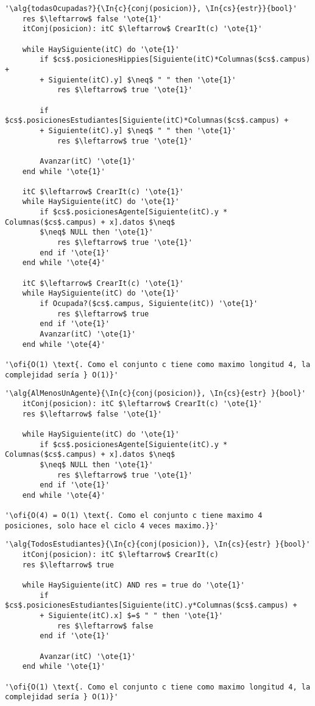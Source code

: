 \begin{lstlisting}[mathescape]
'\alg{todasOcupadas?}{\In{c}{conj(posicion)}, \In{cs}{estr}}{bool}'
	res $\leftarrow$ false '\ote{1}'
	itConj(posicion): itC $\leftarrow$ CrearIt(c) '\ote{1}'
	
	while HaySiguiente(itC) do '\ote{1}'
		if $cs$.posicionesHippies[Siguiente(itC)*Columnas($cs$.campus) +
		+ Siguiente(itC).y] $\neq$ " " then '\ote{1}'
			res $\leftarrow$ true '\ote{1}'

		if $cs$.posicionesEstudiantes[Siguiente(itC)*Columnas($cs$.campus) +
		+ Siguiente(itC).y] $\neq$ " " then '\ote{1}'
			res $\leftarrow$ true '\ote{1}'
	
		Avanzar(itC) '\ote{1}'
	end while '\ote{1}'

	itC $\leftarrow$ CrearIt(c) '\ote{1}'
	while HaySiguiente(itC) do '\ote{1}'
		if $cs$.posicionesAgente[Siguiente(itC).y * Columnas($cs$.campus) + x].datos $\neq$
		$\neq$ NULL then '\ote{1}'
			res $\leftarrow$ true '\ote{1}'
		end if '\ote{1}'
	end while '\ote{4}'

	itC $\leftarrow$ CrearIt(c) '\ote{1}'
	while HaySiguiente(itC) do '\ote{1}'
		if Ocupada?($cs$.campus, Siguiente(itC)) '\ote{1}'
			res $\leftarrow$ true
		end if '\ote{1}'
		Avanzar(itC) '\ote{1}'
	end while '\ote{4}'

'\ofi{O(1) \text{. Como el conjunto c tiene como maximo longitud 4, la complejidad sería } O(1)}'
\end{lstlisting}

\begin{lstlisting}[mathescape]
'\alg{AlMenosUnAgente}{\In{c}{conj(posicion)}, \In{cs}{estr} }{bool}'
	itConj(posicion): itC $\leftarrow$ CrearIt(c) '\ote{1}'
	res $\leftarrow$ false '\ote{1}'

	while HaySiguiente(itC) do '\ote{1}'
		if $cs$.posicionesAgente[Siguiente(itC).y * Columnas($cs$.campus) + x].datos $\neq$
		$\neq$ NULL then '\ote{1}'
			res $\leftarrow$ true '\ote{1}'
		end if '\ote{1}'
	end while '\ote{4}'

'\ofi{O(4) = O(1) \text{. Como el conjunto c tiene maximo 4 posiciones, solo hace el ciclo 4 veces maximo.}}'
\end{lstlisting}

\begin{lstlisting}[mathescape]
'\alg{TodosEstudiantes}{\In{c}{conj(posicion)}, \In{cs}{estr} }{bool}'
	itConj(posicion): itC $\leftarrow$ CrearIt(c)
	res $\leftarrow$ true
	
	while HaySiguiente(itC) AND res = true do '\ote{1}'
		if $cs$.posicionesEstudiantes[Siguiente(itC).y*Columnas($cs$.campus) +
		+ Siguiente(itC).x] $=$ " " then '\ote{1}'
			res $\leftarrow$ false
		end if '\ote{1}'

		Avanzar(itC) '\ote{1}'
	end while '\ote{1}'

'\ofi{O(1) \text{. Como el conjunto c tiene como maximo longitud 4, la complejidad sería } O(1)}'
\end{lstlisting}

